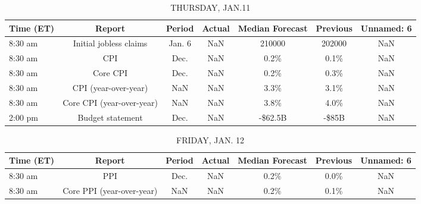 \documentclass{article}%
\begin{document}
\begin{table}[htbp]%
\caption{THURSDAY, JAN.11}%
\centering%
\begin{adjustbox}{width=1\textwidth}%
\begin{tabular}{lcccccc}
\toprule
Time (ET) &                    Report & Period & Actual & Median Forecast & Previous & Unnamed: 6 \\
\midrule
  8:30 am &    Initial jobless claims & Jan. 6 &    NaN &          210000 &   202000 &        NaN \\
  8:30 am &                       CPI &   Dec. &    NaN &            0.2\% &     0.1\% &        NaN \\
  8:30 am &                  Core CPI &   Dec. &    NaN &            0.2\% &     0.3\% &        NaN \\
  8:30 am &      CPI (year-over-year) &    NaN &    NaN &            3.3\% &     3.1\% &        NaN \\
  8:30 am & Core CPI (year-over-year) &    NaN &    NaN &            3.8\% &     4.0\% &        NaN \\
  2:00 pm &          Budget statement &   Dec. &    NaN &         -\$62.5B &    -\$85B &        NaN \\
\bottomrule
\end{tabular}
%
\end{adjustbox}%
\end{table}

%


\begin{table}[htbp]%
\caption{FRIDAY, JAN. 12}%
\centering%
\begin{adjustbox}{width=1\textwidth}%
\begin{tabular}{lcccccc}
\toprule
Time (ET) &                    Report & Period & Actual & Median Forecast & Previous & Unnamed: 6 \\
\midrule
  8:30 am &                       PPI &   Dec. &    NaN &            0.2\% &     0.0\% &        NaN \\
  8:30 am & Core PPI (year-over-year) &    NaN &    NaN &            0.2\% &     0.1\% &        NaN \\
\bottomrule
\end{tabular}
%
\end{adjustbox}%
\end{table}
\end{document}
